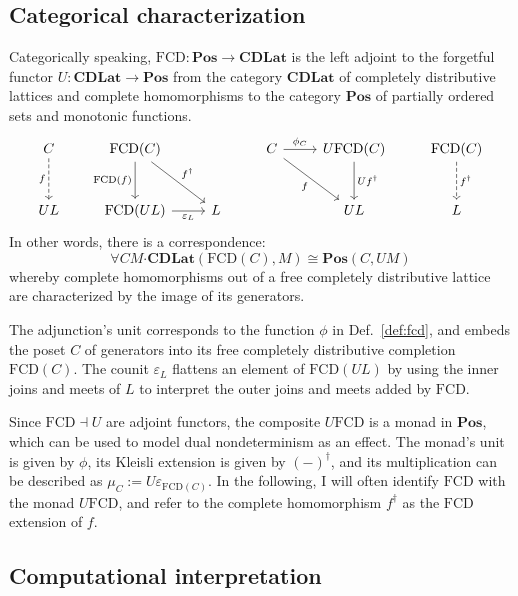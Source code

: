 \documentclass[11pt,oneside]{book}
\theoremstyle{definition}
\newcommand{\bdot}{\boldsymbol{\cdot}}
\begin{document}

\subsection{Categorical characterization} %

Categorically speaking,
$\mathrm{FCD} : \mathbf{Pos} \rightarrow \mathbf{CDLat}$
is the left adjoint to the forgetful functor
$U : \mathbf{CDLat} \rightarrow \mathbf{Pos}$
from the category $\mathbf{CDLat}$
of completely distributive lattices and complete homomorphisms
to the category $\mathbf{Pos}$
of partially ordered sets and monotonic functions.
\[
  \begin{tikzcd}[row sep=large]
    C \ar[d, "f"', dashed] &
    \mathrm{FCD}(C) \ar[d, "\mathrm{FCD}(f)"'] \ar[dr, "f^\dagger"] &
    &
    C \ar[r, "\phi_C"] \ar[dr, "f"'] &
    U \mathrm{FCD}(C) \ar[d, "U f^\dagger"] &
    \mathrm{FCD}(C) \ar[d, "f^\dagger", dashed]
    \\
    U L &
    \mathrm{FCD}(U L) \ar[r, "\varepsilon_L"'] &
    L & & U L & L
  \end{tikzcd}
\]
In other words,
there is a correspondence:
\[
  \forall C M \bdot
  \mathbf{CDLat}(\mathrm{FCD}(C), M) \cong
  \mathbf{Pos}(C, U M)
\]
whereby complete homomorphisms out of a
free completely distributive lattice
are characterized by
the image of its generators.

The adjunction's unit corresponds to the function $\phi$
in Def.~\ref{def:fcd},
and embeds the poset $C$ of generators into
its free completely distributive completion $\mathrm{FCD}(C)$.
The counit $\varepsilon_L$ flattens an element of $\mathrm{FCD}(U L)$
by using the inner joins and meets of $L$ to interpret
the outer joins and meets added by $\mathrm{FCD}$.

Since $\mathrm{FCD} \dashv U$ are adjoint functors,
the composite $U \mathrm{FCD}$
is a monad in $\mathbf{Pos}$,
which can be used to model dual nondeterminism
as an effect.
The monad's unit is given by $\phi$,
its Kleisli extension is given by $(-)^\dagger$,
and its multiplication can be described as
$\mu_C := U \varepsilon_{\mathrm{FCD}(C)}$.
In the following,
I will often identify $\mathrm{FCD}$ with
the monad $U \mathrm{FCD}$,
and refer to the complete homomorphism
$f^\dagger$ as the $\mathrm{FCD}$ extension of $f$.


\subsection{Computational interpretation}
\end{document}
